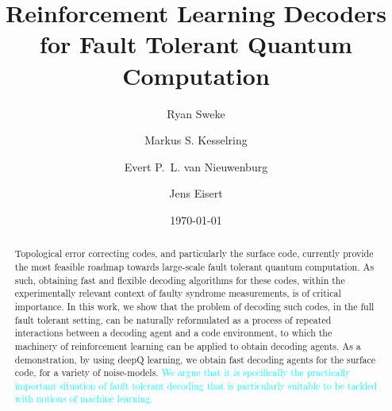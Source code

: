 \documentclass[twocolumn,preprintnumbers,amsmath,amssymb,notitlepage,nofootinbib,longbibliography,superscriptaddress,aps,pra,10pt]{revtex4-1}
\newcommand{\je}[1]{\textcolor{cyan}{#1}}
\begin{document}
	\title{Reinforcement Learning Decoders for Fault Tolerant Quantum Computation}

	\author{Ryan Sweke}
	\author{Markus S. Kesselring}
	\author{Evert P.~L. van Nieuwenburg}
	\author{Jens Eisert}


	\date{\today}

	\begin{abstract}
		Topological error correcting codes, and particularly the surface code, currently provide the most feasible 
		roadmap towards large-scale fault tolerant quantum computation.
		As such, obtaining fast and flexible decoding algorithms for these codes, within the experimentally relevant context 
		of faulty syndrome measurements, is of critical importance.
		In this work, we show that the problem of decoding such codes, in the full fault tolerant setting, can be naturally reformulated as a process of 
		repeated interactions between a decoding agent and a code environment, to which the machinery of reinforcement learning 
		can be applied to obtain decoding agents.
		As a demonstration, by using deepQ learning, we obtain fast decoding agents for the surface code, for a variety of noise-models.
		 \je{We argue that it is specifically the practically important situation of fault tolerant decoding that is particularly suitable
		 to be tackled with notions of machine learning.}
	\end{abstract}

\maketitle
\end{document}
